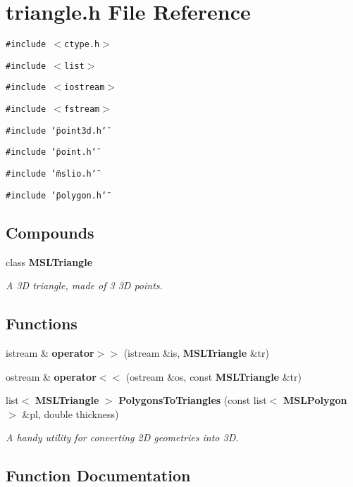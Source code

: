 \section{triangle.h File Reference}
\label{triangle_8h}
{\tt \#include $<$ctype.h$>$}\par
{\tt \#include $<$list$>$}\par
{\tt \#include $<$iostream$>$}\par
{\tt \#include $<$fstream$>$}\par
{\tt \#include \char`\"{}point3d.h\char`\"{}}\par
{\tt \#include \char`\"{}point.h\char`\"{}}\par
{\tt \#include \char`\"{}mslio.h\char`\"{}}\par
{\tt \#include \char`\"{}polygon.h\char`\"{}}\par
\subsection*{Compounds}
\begin{CompactItemize}
\item 
class {\bf MSLTriangle}
\begin{CompactList}\small\item\em A 3D triangle, made of 3 3D points.\item\end{CompactList}\end{CompactItemize}
\subsection*{Functions}
\begin{CompactItemize}
\item 
istream \& {\bf operator$>$$>$} (istream \&is, {\bf MSLTriangle} \&tr)
\item 
ostream \& {\bf operator$<$$<$} (ostream \&os, const {\bf MSLTriangle} \&tr)
\item 
list$<$ {\bf MSLTriangle} $>$ {\bf Polygons\-To\-Triangles} (const list$<$ {\bf MSLPolygon} $>$ \&pl, double thickness)
\begin{CompactList}\small\item\em A handy utility for converting 2D geometries into 3D.\item\end{CompactList}\end{CompactItemize}


\subsection{Function Documentation}
